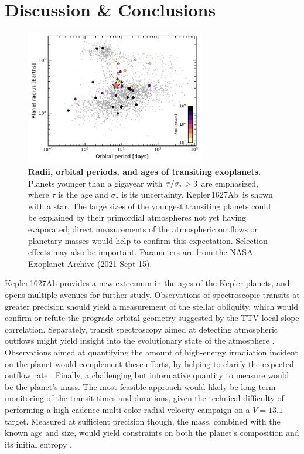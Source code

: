 \documentclass[12pt,modern,twocolumn,tighten]{aastex63}
\newcommand{\pn}{Kepler\,1627Ab} %
\begin{document}
\section{Discussion \& Conclusions}
\label{sec:conc}

\begin{figure}[tp]
	\begin{center}
		\leavevmode
		\includegraphics[width=0.7\textwidth]{f5.pdf}
	\end{center}
	\vspace{-0.7cm}
	\caption{
		{\bf Radii, orbital periods, and ages of transiting exoplanets}.
		Planets younger than a gigayear with ${\rm \tau}/\sigma_{\tau} >
		3$ are emphasized, where $\tau$ is the age and $\sigma_{\tau}$ is
		its uncertainty.  \pn\ is shown with a star.  The large sizes of
		the youngest transiting planets could be explained by their
		primordial atmospheres not yet having evaporated; direct
		measurements of the atmospheric outflows or planetary masses would
		help to confirm this expectation.  Selection effects may also be
		important.  Parameters are from the NASA Exoplanet Archive (2021
		Sept 15).
		\label{fig:rp_period_age}
	}
\end{figure}


Kepler\,1627Ab provides a new extremum in the ages of the Kepler
planets, and opens multiple avenues for further study.  
Observations of spectroscopic transits at greater precision should yield a
measurement of the stellar obliquity, which would confirm or refute the prograde orbital
geometry suggested by the TTV-local slope correlation.  Separately,
transit spectroscopy aimed at detecting atmospheric outflows might
yield insight into the evolutionary state of the atmosphere
\citep[{\it
e.g.},][]{ehrenreich_giant_2015,spake_helium_2018,vissapragada_2020}.
Observations aimed at quantifying the amount of high-energy
irradiation incident on the planet would complement these efforts, by
helping to clarify the expected outflow rate \citep[{\it
e.g.},][]{poppenhaeger_2021}.  Finally, a challenging but informative
quantity to measure would be the planet's mass.  The most feasible
approach would likely be
long-term monitoring of the transit times and durations,
given the technical difficulty of performing a high-cadence multi-color radial velocity campaign
on a $V=13.1$ target.
Measured at sufficient precision though, the mass, combined with the known
age and size, would yield constraints on both the planet's composition
and its initial entropy \citep{owen_constraining_2020}.
\end{document}
